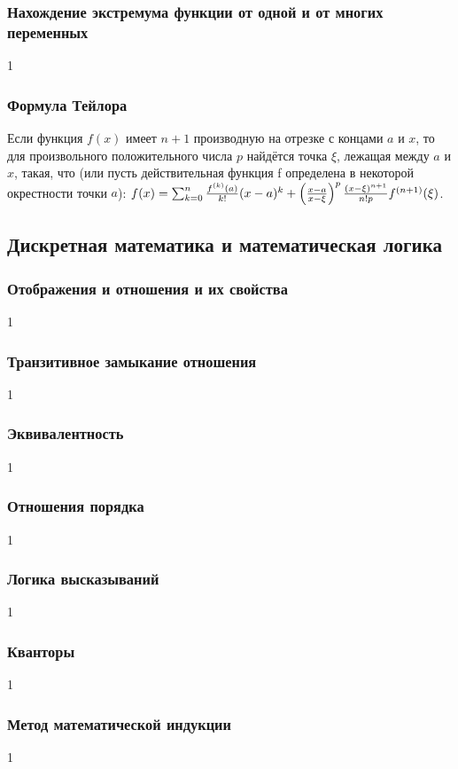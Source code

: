 \documentclass[12pt]{matmex-diploma}
\begin{document}
        \subsubsection*{Нахождение экстремума функции от одной и от многих переменных}
            1
        \subsubsection*{Формула Тейлора}
        
            Если функция $f(x)$ имеет $n+1$ производную на отрезке с концами $a$ и $x$, то для произвольного положительного числа $p$ найдётся точка $\xi$, лежащая между $a$ и $x$, такая, что (или пусть действительная функция f определена в некоторой окрестности точки $a$): 
            $f(x) = \sum_{k=0}^n {{f^{(k)}(a)} \over k!}(x-a)^k + {\left({x-a} \over {x - \xi}\right)^p {(x- \xi)^{n+1} \over n!p}f^{(n+1)}(\xi)}$.
        
    \subsection{Дискретная математика и математическая логика}
    
        \subsubsection*{Отображения и отношения и их свойства}
            1
        \subsubsection*{Транзитивное замыкание отношения}
            1
        \subsubsection*{Эквивалентность}
            1
        \subsubsection*{Отношения порядка}
            1
        \subsubsection*{Логика высказываний}
            1
        \subsubsection*{Кванторы}
            1
        \subsubsection*{Метод математической индукции}
            1
\end{document}
